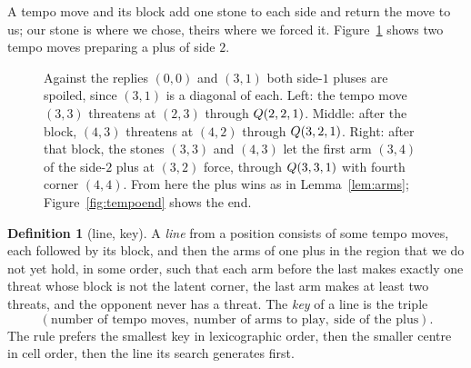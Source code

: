 \documentclass[11pt]{amsart}
\theoremstyle{definition}
\newtheorem{definition}[theorem]{Definition}
\theoremstyle{remark}
\begin{document}
A tempo move and its block add one stone to each side and return the
move to us; our stone is where we chose, theirs where we forced it.
Figure~\ref{fig:tempo} shows two tempo moves preparing a plus of side
$2$.

\begin{figure}[ht]
\centering
{}
\hspace{1em}
\hspace{1em}
\caption{Against the replies $(0,0)$ and $(3,1)$ both side-$1$ pluses
are spoiled, since $(3,1)$ is a diagonal of each. Left: the tempo move
$(3,3)$ threatens at $(2,3)$ through $Q(2,2,1)$. Middle: after the
block, $(4,3)$ threatens at $(4,2)$ through $Q(3,2,1)$. Right: after
that block, the stones $(3,3)$ and $(4,3)$ let the first arm $(3,4)$
of the side-$2$ plus at $(3,2)$ force, through $Q(3,3,1)$ with
fourth corner $(4,4)$. From here the plus wins as in
Lemma~\ref{lem:arms}; Figure~\ref{fig:tempoend} shows the end.}
\label{fig:tempo}
\end{figure}

\begin{definition}[line, key]\label{def:line}
A \emph{line} from a position consists of some tempo moves, each
followed by its block, and then the arms of one plus in the region
that we do not yet hold, in some order, such that each arm before the
last makes exactly one threat whose block is not the latent corner,
the last arm makes at least two threats, and the opponent never has a
threat. The \emph{key} of a line is the triple
\[
  (\text{number of tempo moves},\ \text{number of arms to play},\
  \text{side of the plus}).
\]
The rule prefers the smallest key in lexicographic order, then the
smaller centre in cell order, then the line its search generates
first.
\end{definition}
\end{document}
